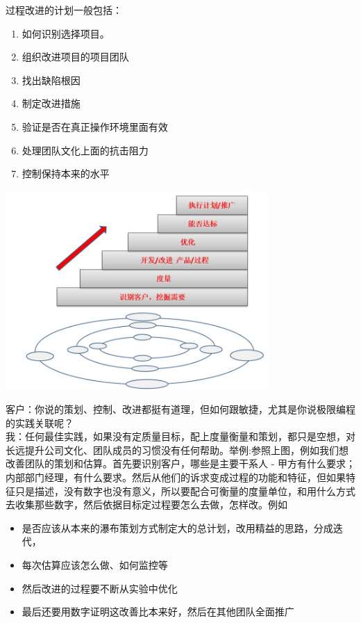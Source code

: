 过程改进的计划一般包括：

\begin{enumerate}
\tightlist
\item
  如何识别选择项目。
\item
  组织改进项目的项目团队
\item
  找出缺陷根因
\item
  制定改进措施
\item
  验证是否在真正操作环境里面有效
\item
  处理团队文化上面的抗击阻力
\item
  控制保持本来的水平\\
\end{enumerate}


\includegraphics[width=10cm]{IntroXPnJuranStepsScreenshot_2022-10-27_194505.jpg}

客户：你说的策划、控制、改进都挺有道理，但如何跟敏捷，尤其是你说极限编程的实践关联呢？\\
我：任何最佳实践，如果没有定质量目标，配上度量衡量和策划，都只是空想，对长远提升公司文化、团队成员的习惯没有任何帮助。举例:参照上图，例如我们想改善团队的策划和估算。首先要识别客户，哪些是主要干系人
-
甲方有什么要求；内部部门经理，有什么要求。然后从他们的诉求变成过程的功能和特征，但如果特征只是描述，没有数字也没有意义，所以要配合可衡量的度量单位，和用什么方式去收集那些数字，然后依据目标定过程要怎么去做，怎样改。例如

\begin{itemize}
\tightlist
\item
  是否应该从本来的瀑布策划方式制定大的总计划，改用精益的思路，分成迭代，
\item
  每次估算应该怎么做、如何监控等
\item
  然后改进的过程要不断从实验中优化
\item
  最后还要用数字证明这改善比本来好，然后在其他团队全面推广\\
\end{itemize}

